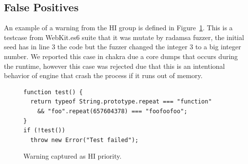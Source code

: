 \documentclass[10pt,conference,anonymous]{IEEEtran}
\begin{document}
\subsection{False Positives}

An example of a warning from the HI group is defined in Figure~\ref{fig:hi-priority}. 
This is a testcase from WebKit.es6 suite that it was mutate by radamsa fuzzer, the 
initial seed has in line 3 the code  but the fuzzer changed the 
integer 3 to a big integer number. We reported this case in chakra due a core dumps that occurs
during the runtime, however this case was rejected due  that
this is an intentional behavior of engine that crash the process if it runs out of memory.

\begin{figure}[h!]
  \centering
  \scriptsize
  \begin{lstlisting}
function test() {
  return typeof String.prototype.repeat === "function"
    && "foo".repeat(657604378) === "foofoofoo";
}
if (!test())
  throw new Error("Test failed");
  \end{lstlisting}
  \normalsize
  \caption{Warning captured as HI priority.}
  \label{fig:hi-priority}
  \end{figure}
\end{document}
